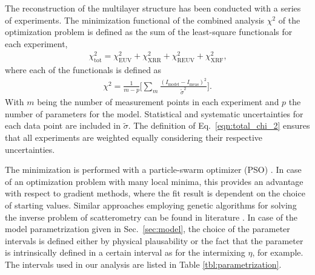\documentclass{iucr}              %
\begin{document}
The reconstruction of the multilayer structure has been conducted with a series of experiments. The minimization functional of the combined analysis $\chi^2$ of the optimization problem is defined as the sum of the least-square functionals for each experiment,
\begin{align}
\chi^2_\text{tot} = \chi^2_\text{EUV} +\chi^2_\text{XRR} +\chi^2_\text{REUV} + \chi^2_\text{XRF}\text{,} \label{eqn:total_chi_2}
\end{align}
where each of the functionals is defined as
\begin{align}
\chi^2 = \frac{1}{m - p} \bigg[\sum\limits_{m} \frac{(I_\text{model} - I_\text{meas})^2}{\tilde{\sigma}^2} \bigg] \text{.}
\end{align}
With $m$ being the number of measurement points in each experiment and $p$ the number of parameters for the model. Statistical and systematic uncertainties for each data point are included in $\tilde{\sigma}$. The definition of Eq.~\eqref{eqn:total_chi_2} ensures that all experiments are weighted equally considering their respective uncertainties.

The minimization is performed with a particle-swarm optimizer (PSO) \cite{Kennedy2010}. In case of an optimization problem with many local minima, this provides an advantage with respect to gradient methods, where the fit result is dependent on the choice of starting values. Similar approaches employing genetic algorithms for solving the inverse problem of scatterometry can be found in literature \cite{del2000modeling}. In case of the model parametrization given in Sec.~\ref{sec:model}, the choice of the parameter intervals is defined either by physical plausability or the fact that the parameter is intrinsically defined in a certain interval as for the intermixing $\eta$, for example. The intervals used in our analysis are listed in Table \ref{tbl:parametrization}.
\end{document}
